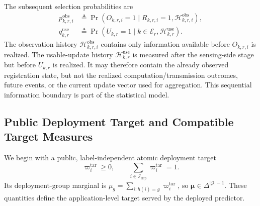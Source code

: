 \documentclass[letterpaper,journal]{IEEEtran}
\begin{document}
The subsequent selection probabilities are
\begin{align}
 p^{\mathrm{obs}}_{k,r,i}
 &\triangleq
 \Pr\!\left(
 O_{k,r,i}=1
 \mid
 R_{k,r,i}=1,\mathcal{H}^{\mathrm{obs}}_{k,r,i}
 \right),
 \label{eq:pobs_def}\\
 q^{\mathrm{use}}_{k,r}
 &\triangleq
 \Pr\!\left(
 U_{k,r}=1
 \mid
 k\in\mathcal{E}_r,\mathcal{H}^{\mathrm{use}}_{k,r}
 \right).
 \label{eq:quse_def}
\end{align}
The observation history $\mathcal{H}^{\mathrm{obs}}_{k,r,i}$ contains
only information available before $O_{k,r,i}$ is realized.  The
usable-update history $\mathcal{H}^{\mathrm{use}}_{k,r}$ is measured
after the sensing-side stage but before $U_{k,r}$ is realized.  It may
therefore contain the already observed registration state, but not the
realized computation/transmission outcomes, future events, or the
current update vector used for aggregation.  This sequential
information boundary is part of the statistical model.

\subsection{Public Deployment Target and Compatible Target Measures}
\label{subsec:target_measures}

We begin with a public, label-independent atomic deployment target
\begin{equation}
    \varpi_i^{\mathrm{tar}}\ge0,
    \qquad
    \sum_{i\in\mathcal{I}_{\mathrm{dep}}}
    \varpi_i^{\mathrm{tar}}=1.
    \label{eq:atomic_target}
\end{equation}
Its deployment-group marginal is
$\mu_g=\sum_{i:h(i)=g}\varpi_i^{\mathrm{tar}}$, so
$\boldsymbol{\mu}\in\Delta^{|\mathcal{G}|-1}$.
These quantities define the application-level target served by the deployed
predictor.
\end{document}
